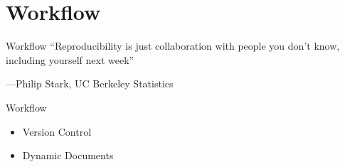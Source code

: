 \documentclass{beamer}
\begin{document}

 \section{Workflow}
 \begin{frame}{Workflow}
``Reproducibility is just collaboration with people you don't know,
including yourself next week''

---Philip Stark, UC Berkeley Statistics
\end{frame}
\begin{frame}{Workflow}

 \begin{itemize}
 \item Version Control
 \item Dynamic Documents
\end{itemize}
\end{frame}


 { %
    \begin{frame}[plain, label=AEAreg]
     \end{frame}
}
\end{document}
